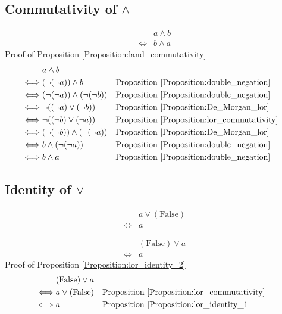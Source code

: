 \subsection{Commutativity of $\land$}
\begin{prop}
\label{Proposition:land_commutativity}
\begin{align*}
& a \land b \\
\iff & b \land a
\end{align*}
Proof of Proposition \ref{Proposition:land_commutativity}
\begin{align*}
& a \land b \\
\iff & (\lnot (\lnot a)) \land b
& & \text{Proposition \ref{Proposition:double_negation}} \\
\iff & (\lnot (\lnot a)) \land (\lnot (\lnot b))
& & \text{Proposition \ref{Proposition:double_negation}} \\
\iff & \lnot ((\lnot a) \lor (\lnot b))
& & \text{Proposition \ref{Proposition:De_Morgan_lor}} \\
\iff & \lnot ((\lnot b) \lor (\lnot a))
& & \text{Proposition \ref{Proposition:lor_commutativity}} \\
\iff & (\lnot (\lnot b)) \land (\lnot (\lnot a))
& & \text{Proposition \ref{Proposition:De_Morgan_lor}} \\
\iff & b \land (\lnot (\lnot a))
& & \text{Proposition \ref{Proposition:double_negation}} \\
\iff & b \land a
& & \text{Proposition \ref{Proposition:double_negation}} \\
\end{align*}
\end{prop}

\subsection{Identity of $\lor$}
\begin{prop}
\label{Proposition:lor_identity_1}
\begin{align*}
& a \lor (\text{False}) \\
\iff & a
\end{align*}
\end{prop}

\begin{prop}
\label{Proposition:lor_identity_2}
\begin{align*}
& (\text{False}) \lor a \\
\iff & a
\end{align*}
Proof of Proposition \ref{Proposition:lor_identity_2}
\begin{align*}
& (\text{False}) \lor a \\
\iff & a \lor (\text{False})
& & \text{Proposition \ref{Proposition:lor_commutativity}} \\
\iff & a
& & \text{Proposition \ref{Proposition:lor_identity_1}} \\
\end{align*}
\end{prop}

